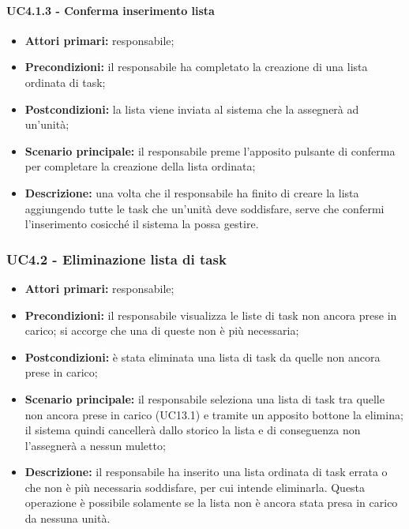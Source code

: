 \paragraph{UC4.1.3 - Conferma inserimento lista}
\begin{itemize}
	\item 	\textbf{Attori primari:} responsabile;
	\item 	\textbf{Precondizioni:} il responsabile ha completato la creazione di una lista ordinata di task;
	\item 	\textbf{Postcondizioni:} la lista viene inviata al sistema che la assegnerà ad un'unità;
	\item 	\textbf{Scenario principale:} il responsabile preme l'apposito pulsante di conferma per completare la creazione della lista ordinata;
	\item 	\textbf{Descrizione:} una volta che il responsabile ha finito di creare la lista aggiungendo tutte le task che un'unità deve soddisfare, serve che confermi l'inserimento cosicché il sistema la possa gestire.
	
\end{itemize}


\subsubsection{UC4.2 - Eliminazione lista di task}

\begin{itemize}
	\item 	\textbf{Attori primari:} responsabile;
	\item 	\textbf{Precondizioni:} il responsabile visualizza le liste di task non ancora prese in carico; si accorge che una di queste non è più necessaria;
	\item 	\textbf{Postcondizioni:} è stata eliminata una lista di task da quelle non ancora prese in carico;
	\item 	\textbf{Scenario principale:} il responsabile seleziona una lista di task tra quelle non ancora prese in carico (UC13.1) e tramite un apposito bottone la elimina; il sistema quindi cancellerà dallo storico la lista e di conseguenza non l'assegnerà a nessun muletto;
	\item 	\textbf{Descrizione:} il responsabile ha inserito una lista ordinata di task errata o che non è più necessaria soddisfare, per cui intende eliminarla. Questa operazione è possibile solamente se la lista non è ancora stata presa in carico da nessuna unità.
\end{itemize}


